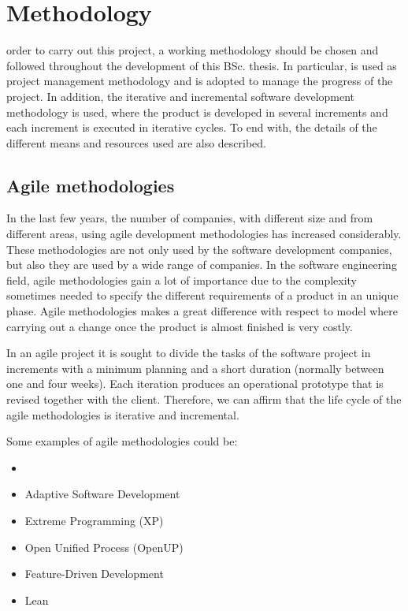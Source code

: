 
\chapter{Methodology}
\label{chap:methodology}

 order to carry out this project, a working methodology should be chosen and followed throughout the development of this \ac{BSc.} thesis. In particular,  is used as project management methodology and  is adopted to manage the progress of the project. In addition, the iterative and incremental software development methodology is used, where the product is developed in several increments and each increment is executed in iterative cycles. To end with, the details of the different means and resources used are also described.


\section{Agile methodologies}

In the last few years, the number of companies, with different size and from different areas, using agile development methodologies has increased considerably. These methodologies are not only used by the software development companies, but also they are used by a wide range of companies. In the software engineering field, agile methodologies gain a lot of importance due to the complexity sometimes needed to specify the different requirements of a product in an unique phase. Agile methodologies makes a great difference with respect to  model where carrying out a change once the product is almost finished is very costly.

In an agile project it is sought to divide the tasks of the software project in increments with a minimum planning and a short duration (normally between one and four weeks). Each iteration produces an operational prototype that is revised together with the client. Therefore, we can affirm that the life cycle of the agile methodologies is iterative and incremental.

Some examples of agile methodologies could be:
\begin{multicols}{2}
	\begin{itemize}
		\item {} \cite{ScrumGuide}
		\item Adaptive Software Development \\ \cite{ASD}
		\item Extreme Programming (XP) \cite{XPProgramming}
		\item Open Unified Process (OpenUP) \\ \cite{Bal07}
		\item Feature-Driven Development \cite{FDD}
		\item Lean \cite{PP03}
	\end{itemize}
\end{multicols}

